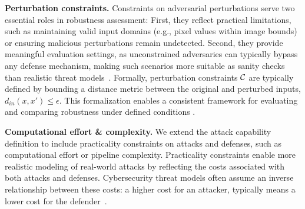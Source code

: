 \textbf{Perturbation constraints.} Constraints on adversarial perturbations serve two essential roles in robustness assessment: First, they reflect practical limitations, such as maintaining valid input domains (e.g., pixel values within image bounds) or ensuring malicious perturbations remain undetected. Second, they provide meaningful evaluation settings, as unconstrained adversaries can typically bypass any defense mechanism, making such scenarios more suitable as sanity checks than realistic threat models~\cite{goodfellow_explaining_2015}.
Formally, perturbation constraints ${\mathcal{C}}$ are typically defined by bounding a distance metric between the original and perturbed inputs, $d_{in}(x, x') \leq \epsilon$. This formalization enables a consistent framework for evaluating and comparing robustness under defined conditions \cite{carlini_evaluating_2019}.

\textbf{Computational effort \& complexity.} We extend the attack capability definition to include practicality constraints on attacks and defenses, such as computational effort or pipeline complexity. Practicality constraints enable more realistic modeling of real-world attacks by reflecting the costs associated with both attacks and defenses. Cybersecurity threat models often assume an inverse relationship between these costs: a higher cost for an attacker, typically means a lower cost for the defender~\cite{barreno_security_2010}.



